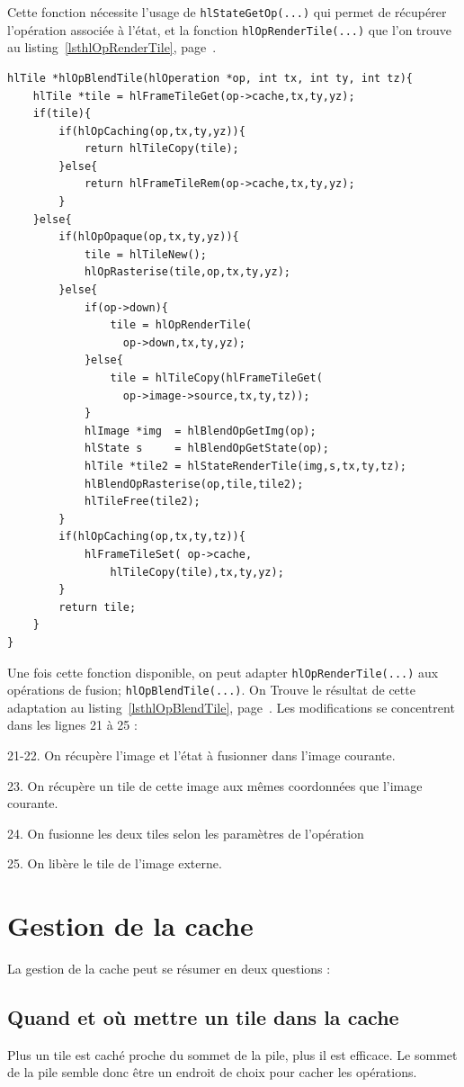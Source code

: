 		Cette fonction nécessite l'usage de \lstinline$hlStateGetOp(...)$ qui permet de récupérer l'opération associée à l'état, et la fonction
		\lstinline$hlOpRenderTile(...)$ que l'on trouve au listing~\ref{lsthlOpRenderTile}, page~\pageref{lsthlOpRenderTile}.
		\begin{lstlisting}[float,caption={Rasterisation d'opérations},frame=tb,label=lsthlOpBlendTile]
hlTile *hlOpBlendTile(hlOperation *op, int tx, int ty, int tz){
	hlTile *tile = hlFrameTileGet(op->cache,tx,ty,yz);
	if(tile){
		if(hlOpCaching(op,tx,ty,yz)){
			return hlTileCopy(tile);
		}else{
			return hlFrameTileRem(op->cache,tx,ty,yz);
		}
	}else{
		if(hlOpOpaque(op,tx,ty,yz)){
			tile = hlTileNew();
			hlOpRasterise(tile,op,tx,ty,yz);
		}else{
			if(op->down){
				tile = hlOpRenderTile(
				  op->down,tx,ty,yz);
			}else{
				tile = hlTileCopy(hlFrameTileGet(
				  op->image->source,tx,ty,tz));
			}
			hlImage *img  = hlBlendOpGetImg(op);
			hlState s     = hlBlendOpGetState(op);
			hlTile *tile2 = hlStateRenderTile(img,s,tx,ty,tz);
			hlBlendOpRasterise(op,tile,tile2);
			hlTileFree(tile2);
		}
		if(hlOpCaching(op,tx,ty,tz)){
			hlFrameTileSet(	op->cache,
				hlTileCopy(tile),tx,ty,yz);
		}
		return tile;
	}
}
	\end{lstlisting}
		Une fois cette fonction disponible, on peut adapter \linebreak \lstinline$hlOpRenderTile(...)$ aux opérations de fusion; \lstinline$hlOpBlendTile(...)$.
		On Trouve le résultat de cette adaptation au listing~\ref{lsthlOpBlendTile}, page~\pageref{lsthlOpBlendTile}. Les modifications se concentrent
		dans les lignes 21 à 25 :
		\begin{description}
			\item{21-22.} On récupère l'image et l'état à fusionner dans l'image courante.
			\item{23.} On récupère un tile de cette image aux mêmes coordonnées que l'image courante.
			\item{24.} On fusionne les deux tiles selon les paramètres de l'opération
			\item{25.} On libère le tile de l'image externe. 
		\end{description}

	\section{Gestion de la cache}
		La gestion de la cache peut se résumer en deux questions :
		\subsection{Quand et où mettre un tile dans la cache}
			Plus un tile est caché proche du sommet de la pile, plus il est efficace. Le sommet de la pile semble donc
			être un endroit de choix pour cacher les opérations. 

